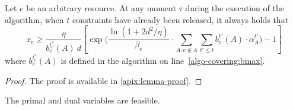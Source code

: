 \setcounter{theorem}{0}
\begin{lemma}
\label{lem:bound-x}
Let $e$ be an arbitrary resource.
At any moment $\tau$ during the execution of the algorithm,
when $t$ constraints have already been released, it always holds that
$$
x_{e}	\geq  \frac{\eta}{b^{t_{e}^{*}}_{e}(A) \ d}
		\left[ \exp\biggl( \frac{\ln(1+2d^{2}/\eta)}{\beta_{e}}
				\cdot \sum_{A: e \notin A} \sum_{t' \le t} b^{t'}_{e}(A) \cdot \alpha^{t'}_{A} \biggr) - 1 \right]
$$
where $b^{t_{e}^{*}}_{e}(A)$ is defined in the algorithm on line~\ref{algo-covering:bmax}.
\end{lemma}
\begin{proof}
	The proof is available in \cref{apix:lemma-proof}.
\end{proof}
%
\begin{lemma} \label{lem:prim-dual-feasible}
The primal and dual variables are feasible.
\end{lemma}
%
